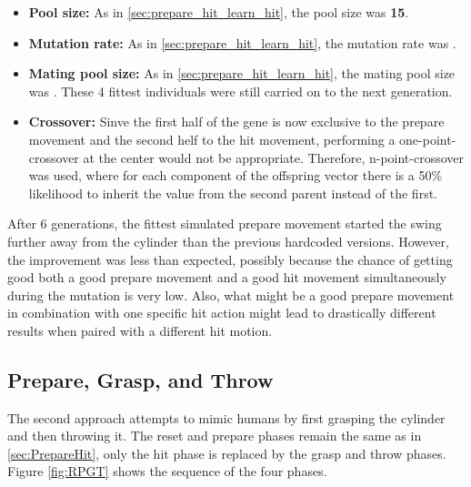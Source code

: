 \begin{itemize}
\item \textbf{Pool size:} As in \ref{sec:prepare_hit_learn_hit}, the pool size was \textbf{15}. 
\item \textbf{Mutation rate:} As in \ref{sec:prepare_hit_learn_hit}, the mutation rate was .
\item \textbf{Mating pool size:} As in \ref{sec:prepare_hit_learn_hit}, the mating pool size was . These 4 fittest individuals were still carried on to the next generation.
\item \textbf{Crossover:} Sinve the first half of the gene is now exclusive to the prepare movement and the second helf to the hit movement, performing a one-point-crossover at the center would not be appropriate. Therefore, n-point-crossover was used, where for each component of the offspring vector there is a 50\% likelihood to inherit the value from the second parent instead of the first.
\end{itemize}

After 6 generations, the fittest simulated prepare movement started the swing further away from the cylinder than the previous hardcoded versions. However, the improvement was less than expected, possibly because the chance of getting good both a good prepare movement and a good hit movement simultaneously during the mutation is very low. Also, what might be a good prepare movement in combination with one specific hit action might lead to drastically different results when paired with a different hit motion.


\subsection{Prepare, Grasp, and Throw} \label{sec:Throw}

The second approach attempts to mimic humans by first grasping the cylinder and then throwing it.
The reset and prepare phases remain the same as in \ref{sec:PrepareHit}, only the hit phase is replaced by the grasp and throw phases.
Figure \ref{fig:RPGT} shows the sequence of the four phases.

